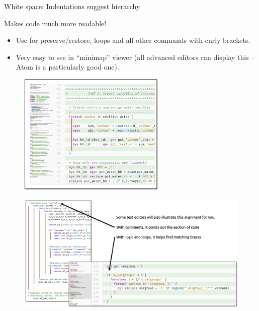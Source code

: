 \documentclass[aspectratio=169]{beamer}
\begin{document}
\begin{frame}[fragile]{White space: Indentations suggest hierarchy}
\begin{multicols}{2}	
	
	Makes code much more readable!
	
	\begin{itemize}[<default overlay specification>]
		\item<1>  Use for preserve/restore, loops and all other commands with curly brackets. 
		\item<1>  Very easy to see in “minimap” viewer (all advanced editors can display this – Atom is a particularly good one).
	\end{itemize}
	
	\begin{figure}
		\centering
		\includegraphics[width=70mm, right]{img/WHite_space2}
	\end{figure}
	
\end{multicols}
\end{frame}


\begin{frame}

	\begin{figure}
		\centering
		\includegraphics[width=\linewidth]{img/White_space3}
	\end{figure}

\end{frame}
\end{document}
